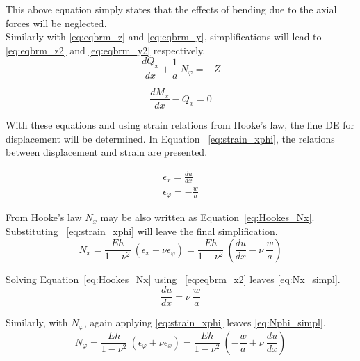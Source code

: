 This above equation simply states that the effects of bending due to the axial forces will be neglected.\\

Similarly with \ref{eq:eqbrm_z} and \ref{eq:eqbrm_y}, simplifications will lead to \ref{eq:eqbrm_z2} and \ref{eq:eqbrm_y2} respectively.
\begin{equation}
	\label{eq:eqbrm_z2}
	\frac{dQ_x}{dx}+\frac{1}{a}\ N_\varphi = -Z
\end{equation}

\begin{equation}
	\label{eq:eqbrm_y2}
	\frac{dM_x}{dx}- Q_x= 0
\end{equation} 

With these equations and using strain relations from Hooke's law, the fine DE for displacement will be determined. In Equation ~\ref{eq:strain_xphi}, the relations between displacement and strain are presented.

\begin{equation}
	\label{eq:strain_xphi}
	\begin{aligned}
		\epsilon_x = \frac{du}{dx}      \\
		\epsilon_\varphi = -\frac{w}{a} 
	\end{aligned}
\end{equation}

From Hooke's law $N_x$ may be also written as Equation~\ref{eq:Hookes_Nx}. Substituting ~\ref{eq:strain_xphi} will leave the final simplification.
\begin{equation}
	\label{eq:Hookes_Nx}
	N_x = \frac{Eh}{1-\nu^2}\ \left( \epsilon_x + \nu \epsilon_\varphi \right) =  \frac{Eh}{1-\nu^2}\ \left( \frac{du}{dx} -\nu \ \frac{w}{a} \right)
\end{equation} 

Solving Equation~\ref{eq:Hookes_Nx} using ~\ref{eq:eqbrm_x2} leaves \ref{eq:Nx_simpl}.
\begin{equation}
	\label{eq:Nx_simpl}
	\frac{du}{dx} =  \nu \ \frac{w}{a}
\end{equation} 

Similarly, with $N_\varphi$, again applying \ref{eq:strain_xphi} leaves \ref{eq:Nphi_simpl}.
\begin{equation}
	\label{eq:Hookes_Nphi}
	N_\varphi = \frac{Eh}{1-\nu^2}\ \left( \epsilon_\varphi + \nu \epsilon_x \right) = \frac{Eh}{1-\nu^2}\  \left( -\frac{w}{a}+\nu \ \frac{du}{dx} \right)
\end{equation} 

